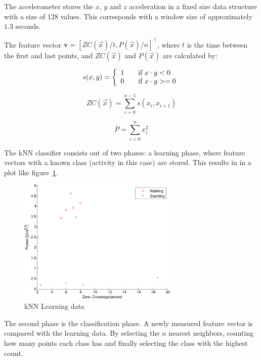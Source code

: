 \documentclass[journal]{IEEEtran}
\let\MYoriglatexcaption\caption
\renewcommand{\caption}[2][\relax]{\MYoriglatexcaption[#2]{#2}}
\begin{document}
The accelerometer stores the $x$, $y$ and $z$ acceleration in a fixed size
data structure with a size of 128 values. This corresponds with a window size
of approximately $1.3$ seconds.

The feature vector $\mathbf{v} = [ZC(\vec x) / t, P(\vec x)/ n]^\intercal$,
where $t$ is the time between the first and last points, and $ZC(\vec x)$ and
$P(\vec x)$ are calculated by:

\begin{equation}
  s(x,y) = \left\{
    \begin{array}{l l}
      1 & \quad \text{if~} x \cdot y < 0 \\
      0 & \quad \text{if~} x \cdot y >= 0
  \end{array} \right.
\end{equation}

\begin{equation}
  ZC(\vec x) = \sum^{n-1}_{i=0} s(x_i, x_{i+1})
\end{equation}

\begin{equation}
  P = \sum^{n}_{i=0} x_i^2
\end{equation}

The kNN classifier consists out of two phases: a learning phase, where feature
vectors with a known class (activity in this case) are stored. This results in
in a plot like figure~\ref{fig:knn-data}.
\begin{figure}
  \centering
  \includegraphics[width=3in]{images/knn-data.pdf}
  \caption{kNN Learning data}
  \label{fig:knn-data}
\end{figure}

The second phase is the classification phase. A newly measured feature vector
is compared with the learning data. By selecting the $n$ nearest neighbors,
counting how many points each class has and finally selecting the class with
the highest count.
\end{document}
